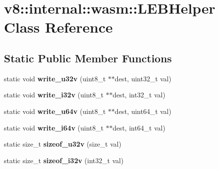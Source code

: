 \hypertarget{classv8_1_1internal_1_1wasm_1_1_l_e_b_helper}{}\section{v8\+:\+:internal\+:\+:wasm\+:\+:L\+E\+B\+Helper Class Reference}
\label{classv8_1_1internal_1_1wasm_1_1_l_e_b_helper}
\subsection*{Static Public Member Functions}
\begin{DoxyCompactItemize}
\item 
static void {\bfseries write\+\_\+u32v} (uint8\+\_\+t $\ast$$\ast$dest, uint32\+\_\+t val)\hypertarget{classv8_1_1internal_1_1wasm_1_1_l_e_b_helper_aba7fa211b585d23907e2f97810c14326}{}\label{classv8_1_1internal_1_1wasm_1_1_l_e_b_helper_aba7fa211b585d23907e2f97810c14326}

\item 
static void {\bfseries write\+\_\+i32v} (uint8\+\_\+t $\ast$$\ast$dest, int32\+\_\+t val)\hypertarget{classv8_1_1internal_1_1wasm_1_1_l_e_b_helper_a1d94e880cd7a12a4002c58174000e2bb}{}\label{classv8_1_1internal_1_1wasm_1_1_l_e_b_helper_a1d94e880cd7a12a4002c58174000e2bb}

\item 
static void {\bfseries write\+\_\+u64v} (uint8\+\_\+t $\ast$$\ast$dest, uint64\+\_\+t val)\hypertarget{classv8_1_1internal_1_1wasm_1_1_l_e_b_helper_ac312fc7d02c81db9d566a6ba97cb310a}{}\label{classv8_1_1internal_1_1wasm_1_1_l_e_b_helper_ac312fc7d02c81db9d566a6ba97cb310a}

\item 
static void {\bfseries write\+\_\+i64v} (uint8\+\_\+t $\ast$$\ast$dest, int64\+\_\+t val)\hypertarget{classv8_1_1internal_1_1wasm_1_1_l_e_b_helper_ae3a71ed3e2355fcdc44da66c703d42de}{}\label{classv8_1_1internal_1_1wasm_1_1_l_e_b_helper_ae3a71ed3e2355fcdc44da66c703d42de}

\item 
static size\+\_\+t {\bfseries sizeof\+\_\+u32v} (size\+\_\+t val)\hypertarget{classv8_1_1internal_1_1wasm_1_1_l_e_b_helper_a885e13dc8eea95f5a5e97c923e6f32e7}{}\label{classv8_1_1internal_1_1wasm_1_1_l_e_b_helper_a885e13dc8eea95f5a5e97c923e6f32e7}

\item 
static size\+\_\+t {\bfseries sizeof\+\_\+i32v} (int32\+\_\+t val)\hypertarget{classv8_1_1internal_1_1wasm_1_1_l_e_b_helper_aba06ba5c995cdc76456d5ee1194c1beb}{}\label{classv8_1_1internal_1_1wasm_1_1_l_e_b_helper_aba06ba5c995cdc76456d5ee1194c1beb}


\end{DoxyCompactItemize}

